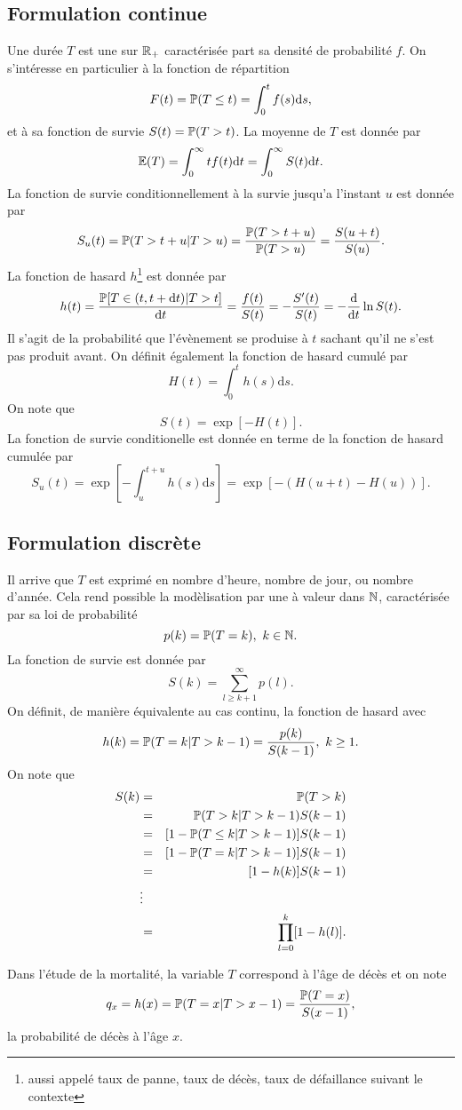 \subsection{Formulation continue}
 Une durée $T$ est une \va sur $\mathbb{R}_+$ caractérisée part sa densité de probabilité $f$. On s'intéresse en particulier à la fonction de répartition 
$$
F(t)=\mathbb{P}(T\leq t) = \int_0^t f(s)\text{d}s,
$$ 
et à sa fonction de survie $S(t) = \mathbb{P}(T>t)$. La moyenne de $T$ est donnée par 
$$
\mathbb{E}(T) = \int_0^\infty t f(t)\text{d}t = \int_0^\infty S(t)\text{d}t.
$$
La fonction de survie conditionnellement à la survie jusqu'a l'instant $u$ est donnée par 
$$
S_u(t) = \mathbb{P}(T> t+u|T>u) = \frac{\mathbb{P}(T> t+u)}{\mathbb{P}(T>u)} = \frac{S(u+t)}{S(u)}.
$$
La fonction de hasard $h$\footnote{aussi appelé taux de panne, taux de décès, taux de défaillance suivant le contexte} est donnée par 
$$
h(t) =\frac{\mathbb{P}[T\in(t,t+\text{d}t)|T>t]}{\text{d}t}= \frac{f(t)}{S(t)}= -\frac{S'(t)}{S(t)} = -\frac{\text{d}}{\text{d}t}\ln S(t).
$$
Il s'agit de la probabilité que l'évènement se produise à $t$ sachant qu'il ne s'est pas produit avant. On définit également la fonction de hasard cumulé par 
$$
H(t) = \int_0^th(s)\text{d}s.
$$
On note que 
$$
S(t) = \exp[-H(t)].
$$
La fonction de survie conditionelle est donnée en terme de la fonction de hasard cumulée par 
$$
S_u(t) = \exp\left[-\int_u^{t+u}h(s)\text{d}s\right] = \exp\left[-(H(u+t)-H(u))\right].
$$
\subsection{Formulation discrète}
Il arrive que $T$ est exprimé en nombre d'heure, nombre de jour, ou nombre d'année. Cela rend possible la modèlisation par une \va à valeur dans $\mathbb{N}$, caractérisée par sa loi de probabilité 
$$
p(k) = \mathbb{P}(T=k),\text{ }k\in\mathbb{N}.
$$
La fonction de survie est donnée par 
$$
S(k) = \sum_{l\geq k+1}^\infty p(l).
$$
On définit, de manière équivalente au cas continu, la fonction de hasard avec 
$$
h(k) = \mathbb{P}(T = k|T>k-1) = \frac{p(k)}{S(k-1)},\text{ }k\geq 1.
$$
On note que 
\begin{eqnarray*}
S(k) &=& \mathbb{P}(T>k)\\
&=& \mathbb{P}(T>k|T>k-1)S(k-1)\\
&=& [1-\mathbb{P}(T\leq k|T>k-1)]S(k-1)\\
&=& [1-\mathbb{P}(T= k|T>k-1)]S(k-1)\\
&=& [1-h(k)]S(k-1)\\
&\vdots&\\
&=&\prod_{l=0}^k[1-h(l)].
\end{eqnarray*}
\begin{remark}
Dans l'étude de la mortalité, la variable $T$ correspond à l'âge de décès et on note 
$$
q_x = h(x) = \mathbb{P}(T=x|T> x-1) = \frac{\mathbb{P}(T=x)}{S(x-1)},
$$
la probabilité de décès à l'âge $x$.
\end{remark}

